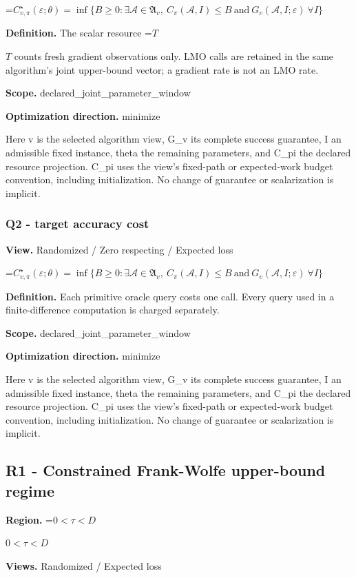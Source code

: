 \documentclass[10pt,a4paper]{article}
\newcommand{\AtlasMath}[1]{\par\begingroup\centering\setbox0=\hbox{$\displaystyle #1$}\ifdim\wd0>1.4\linewidth\typeout{ATLAS WIDE FORMULA: \the\wd0}\fi\ifdim\wd0>\linewidth\resizebox{\linewidth}{!}{\box0}\else\box0\fi\par\endgroup}
\newcommand{\AtlasInlineMath}[1]{\begingroup\setbox0=\hbox{$#1$}\ifdim\wd0>.4\linewidth\endgroup\AtlasMath{#1}\else\endgroup$#1$\fi}
\begin{document}
\AtlasMath{C^\star_{v,\pi}(\varepsilon;\theta)=\inf\{B\ge0:\exists\mathcal A\in\mathfrak A_v,\ C_\pi(\mathcal A,I)\le B\ \text{and}\ G_v(\mathcal A,I;\varepsilon)\ \forall I\}}
\textbf{Definition.} The scalar resource \AtlasInlineMath{T} counts fresh gradient observations only. LMO calls are retained in the same algorithm's joint upper-bound vector; a gradient rate is not an LMO rate.

\textbf{Scope.} declared\_joint\_parameter\_window

\textbf{Optimization direction.} minimize

Here v is the selected algorithm view, G\_v its complete success guarantee, I an admissible fixed instance, theta the remaining parameters, and C\_pi the declared resource projection. C\_pi uses the view's fixed-path or expected-work budget convention, including initialization. No change of guarantee or scalarization is implicit.

\subsubsection{Q2 - target accuracy cost}
\textbf{View.} Randomized / Zero respecting / Expected loss

\AtlasMath{C^\star_{v,\pi}(\varepsilon;\theta)=\inf\{B\ge0:\exists\mathcal A\in\mathfrak A_v,\ C_\pi(\mathcal A,I)\le B\ \text{and}\ G_v(\mathcal A,I;\varepsilon)\ \forall I\}}
\textbf{Definition.} Each primitive oracle query costs one call. Every query used in a finite-difference computation is charged separately.

\textbf{Scope.} declared\_joint\_parameter\_window

\textbf{Optimization direction.} minimize

Here v is the selected algorithm view, G\_v its complete success guarantee, I an admissible fixed instance, theta the remaining parameters, and C\_pi the declared resource projection. C\_pi uses the view's fixed-path or expected-work budget convention, including initialization. No change of guarantee or scalarization is implicit.

\subsection{R1 - Constrained Frank-Wolfe upper-bound regime}
\textbf{Region.} \AtlasInlineMath{0<\tau<D}

\textbf{Views.} Randomized / Expected loss
\end{document}
